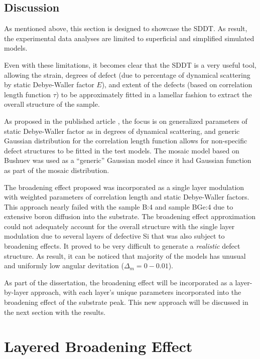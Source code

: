 \subsection{Discussion}
As mentioned above, this section is designed to showcase the SDDT.  As result, the experimental data analyses are limited to superficial and simplified simulated models.  

Even with these limitations, it becomes clear that the SDDT is a very useful tool, allowing the strain, degrees of defect (due to percentage of dynamical scattering by static Debye-Waller factor $E$), and extent of the defects (based on correlation length function $\tau$) to be approximately fitted in a lamellar fashion to extract the overall structure of the sample.

As proposed in the published article \cite{Shreeman1}, the focus is on generalized parameters of static Debye-Waller factor as in degrees of dynamical scattering, and generic Gaussian distribution for the correlation length function allows for non-specific defect structures to be fitted in the test models.  The mosaic model based on Bushuev \cite{Bushuev2} was used as a ``generic'' Gaussian model since it had Gaussian function as part of the mosaic distribution. 

The broadening effect proposed was incorporated as a single layer modulation with weighted parameters of correlation length and static Debye-Waller factors.  This approach nearly failed with the sample B:4 and sample BGe:4 due to extensive boron diffusion into the substrate.  The broadening effect approximation could not adequately account for the overall structure with the single layer modulation due to several layers of defective Si that was also subject to broadening effects.  It proved to be very difficult to generate a {\itshape{realistic}} defect structure.  As result, it can be noticed that majority of the models has unusual and uniformly low angular devitation  ($\Delta_m =0- 0.01$).

As part of the dissertation, the broadening effect will be incorporated as a layer-by-layer approach, with each layer's unique parameters incorporated into the broadening effect of the substrate peak.  This new approach will be discussed in the next section with the results.

\section{Layered Broadening Effect}

